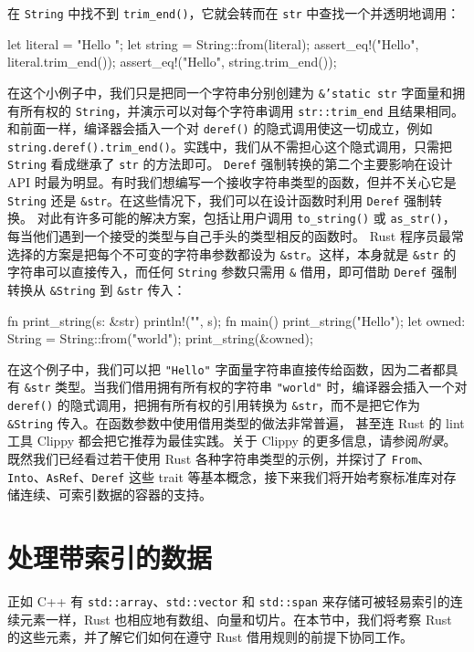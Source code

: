 在 \texttt{String} 中找不到 \texttt{trim\_end()}，它就会转而在 \texttt{str} 中查找一个并透明地调用：
\begin{codebox}[rust]
let literal = "Hello ";
let string = String::from(literal);
assert_eq!("Hello", literal.trim_end());
assert_eq!("Hello", string.trim_end());
\end{codebox}
在这个小例子中，我们只是把同一个字符串分别创建为 \texttt{\&\allowbreak{}'static str} 字面量和拥有所有权的 \texttt{String}，并演示可以对每个字符串调用 \texttt{str::\allowbreak{}trim\_\allowbreak{}end} 且结果相同。和前面一样，编译器会插入一个对 \texttt{deref()} 的隐式调用使这一切成立，例如 \texttt{string.\allowbreak{}deref(\allowbreak{})\allowbreak{}.\allowbreak{}trim\_\allowbreak{}end(\allowbreak{})\allowbreak{}}。实践中，我们从不需担心这个隐式调用，只需把 \texttt{String} 看成继承了 \texttt{str} 的方法即可。
\label{idx:idx_8621db3c}
\texttt{Deref} 强制转换的第二个主要影响在设计 API 时最为明显。有时我们想编写一个接收字符串类型的函数，但并不关心它是 \texttt{String} 还是
\texttt{\&str}。在这些情况下，我们可以在设计函数时利用 \texttt{Deref} 强制转换。
对此有许多可能的解决方案，包括让用户调用 \texttt{to\_\allowbreak{}string(\allowbreak{})\allowbreak{}} 或
\texttt{as\_str()}，每当他们遇到一个接受的类型与自己手头的类型相反的函数时。
Rust 程序员最常选择的方案是把每个不可变的字符串参数都设为 \texttt{\&str}。这样，本身就是 \texttt{\&str} 的字符串可以直接传入，而任何
\texttt{String} 参数只需用 \texttt{\&} 借用，即可借助 \texttt{Deref} 强制转换从
\texttt{\&String} 到 \texttt{\&str} 传入：
\begin{codebox}[rust]
fn print_string(s: &str) {
    println!("{}", s);
}
fn main() {
    print_string("Hello");
    let owned: String = String::from("world");
    print_string(&owned);
}
\end{codebox}
在这个例子中，我们可以把 \texttt{"Hello"} 字面量字符串直接传给函数，因为二者都具有 \texttt{\&str} 类型。当我们借用拥有所有权的字符串 \texttt{"world"} 时，编译器会插入一个对 \texttt{deref()} 的隐式调用，把拥有所有权的引用转换为 \texttt{\&str}，而不是把它作为
\texttt{\&String} 传入。在函数参数中使用借用类型的做法非常普遍，
甚至连 Rust 的 lint 工具 Clippy 都会把它推荐为最佳实践。关于 Clippy 的更多信息，请参阅\emph{附录}。
\label{idx:idx_c69d6f21}
既然我们已经看过若干使用 Rust 各种字符串类型的示例，并探讨了 \texttt{From}、\texttt{Into}、\texttt{AsRef}、\texttt{Deref} 这些 trait 等基本概念，接下来我们将开始考察标准库对存储连续、可索引数据的容器的支持。
\section{处理带索引的数据}
\label{idx:idx_b3b04f0f}
正如 C++ 有 \texttt{std::array}、\texttt{std::vector} 和 \texttt{std::span} 来存储可被轻易索引的连续元素一样，Rust 也相应地有数组、向量和切片。在本节中，我们将考察 Rust 的这些元素，并了解它们如何在遵守 Rust 借用规则的前提下协同工作。
